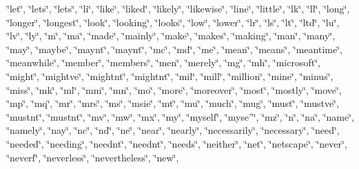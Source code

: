 \char`\"{}let\char`\"{}, \char`\"{}let\textquotesingle{}s\char`\"{}, \char`\"{}lets\char`\"{}, \char`\"{}li\char`\"{}, \char`\"{}like\char`\"{}, \char`\"{}liked\char`\"{}, \char`\"{}likely\char`\"{}, \char`\"{}likewise\char`\"{}, \char`\"{}line\char`\"{}, \char`\"{}little\char`\"{}, \char`\"{}lk\char`\"{}, \char`\"{}ll\char`\"{}, \char`\"{}long\char`\"{}, \char`\"{}longer\char`\"{}, \char`\"{}longest\char`\"{}, \char`\"{}look\char`\"{}, \char`\"{}looking\char`\"{}, \char`\"{}looks\char`\"{}, \char`\"{}low\char`\"{}, \char`\"{}lower\char`\"{}, \char`\"{}lr\char`\"{}, \char`\"{}ls\char`\"{}, \char`\"{}lt\char`\"{}, \char`\"{}ltd\char`\"{}, \char`\"{}lu\char`\"{}, \char`\"{}lv\char`\"{}, \char`\"{}ly\char`\"{}, \char`\"{}m\char`\"{}, \char`\"{}ma\char`\"{}, \char`\"{}made\char`\"{}, \char`\"{}mainly\char`\"{}, \char`\"{}make\char`\"{}, \char`\"{}makes\char`\"{}, \char`\"{}making\char`\"{}, \char`\"{}man\char`\"{}, \char`\"{}many\char`\"{}, \char`\"{}may\char`\"{}, \char`\"{}maybe\char`\"{}, \char`\"{}mayn\textquotesingle{}t\char`\"{}, \char`\"{}maynt\char`\"{}, \char`\"{}mc\char`\"{}, \char`\"{}md\char`\"{}, \char`\"{}me\char`\"{}, \char`\"{}mean\char`\"{}, \char`\"{}means\char`\"{}, \char`\"{}meantime\char`\"{}, \char`\"{}meanwhile\char`\"{}, \char`\"{}member\char`\"{}, \char`\"{}members\char`\"{}, \char`\"{}men\char`\"{}, \char`\"{}merely\char`\"{}, \char`\"{}mg\char`\"{}, \char`\"{}mh\char`\"{}, \char`\"{}microsoft\char`\"{}, \char`\"{}might\char`\"{}, \char`\"{}might\textquotesingle{}ve\char`\"{}, \char`\"{}mightn\textquotesingle{}t\char`\"{}, \char`\"{}mightnt\char`\"{}, \char`\"{}mil\char`\"{}, \char`\"{}mill\char`\"{}, \char`\"{}million\char`\"{}, \char`\"{}mine\char`\"{}, \char`\"{}minus\char`\"{}, \char`\"{}miss\char`\"{}, \char`\"{}mk\char`\"{}, \char`\"{}ml\char`\"{}, \char`\"{}mm\char`\"{}, \char`\"{}mn\char`\"{}, \char`\"{}mo\char`\"{}, \char`\"{}more\char`\"{}, \char`\"{}moreover\char`\"{}, \char`\"{}most\char`\"{}, \char`\"{}mostly\char`\"{}, \char`\"{}move\char`\"{}, \char`\"{}mp\char`\"{}, \char`\"{}mq\char`\"{}, \char`\"{}mr\char`\"{}, \char`\"{}mrs\char`\"{}, \char`\"{}ms\char`\"{}, \char`\"{}msie\char`\"{}, \char`\"{}mt\char`\"{}, \char`\"{}mu\char`\"{}, \char`\"{}much\char`\"{}, \char`\"{}mug\char`\"{}, \char`\"{}must\char`\"{}, \char`\"{}must\textquotesingle{}ve\char`\"{}, \char`\"{}mustn\textquotesingle{}t\char`\"{}, \char`\"{}mustnt\char`\"{}, \char`\"{}mv\char`\"{}, \char`\"{}mw\char`\"{}, \char`\"{}mx\char`\"{}, \char`\"{}my\char`\"{}, \char`\"{}myself\char`\"{}, \char`\"{}myse”\char`\"{}, \char`\"{}mz\char`\"{}, \char`\"{}n\char`\"{}, \char`\"{}na\char`\"{}, \char`\"{}name\char`\"{}, \char`\"{}namely\char`\"{}, \char`\"{}nay\char`\"{}, \char`\"{}nc\char`\"{}, \char`\"{}nd\char`\"{}, \char`\"{}ne\char`\"{}, \char`\"{}near\char`\"{}, \char`\"{}nearly\char`\"{}, \char`\"{}necessarily\char`\"{}, \char`\"{}necessary\char`\"{}, \char`\"{}need\char`\"{}, \char`\"{}needed\char`\"{}, \char`\"{}needing\char`\"{}, \char`\"{}needn\textquotesingle{}t\char`\"{}, \char`\"{}neednt\char`\"{}, \char`\"{}needs\char`\"{}, \char`\"{}neither\char`\"{}, \char`\"{}net\char`\"{}, \char`\"{}netscape\char`\"{}, \char`\"{}never\char`\"{}, \char`\"{}neverf\char`\"{}, \char`\"{}neverless\char`\"{}, \char`\"{}nevertheless\char`\"{}, \char`\"{}new\char`\"{}, 